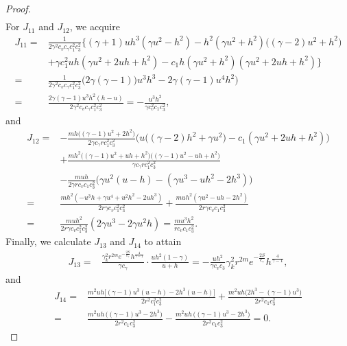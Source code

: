 \documentclass[11pt,reqno]{article}
\numberwithin{equation}{section}
\begin{document}
\begin{proof}
\begin{align*}
\end{align*}
For $J_{11}$ and $J_{12}$, we acquire
\begin{align*}
J_{11}
=& \frac{1}{2\gamma^{2} c_v c_\gamma c_1^{2} c_3^{2}} \bigg\{
   (\gamma+1)uh^{3}(\gamma u^{2}-h^{2}) - h^{2}(\gamma u^{2}+h^{2})\big((\gamma-2)u^{2}+h^{2}\big) \\
& + \gamma c_1^{2} uh (\gamma u^{2}+2uh+h^{2}) - c_1 h (\gamma u^{2}+h^{2})(\gamma u^{2}+2uh+h^{2}) \bigg\} \\
=& \frac{1}{2\gamma^{2} c_v c_\gamma c_1^{2} c_3^{2}} \Big(
   2\gamma(\gamma-1))u^3 h^3 -2\gamma(\gamma-1)u^4 h^2 \Big) \\
=& \frac{2\gamma(\gamma-1)u^3 h^2(h - u)}{2\gamma^{2} c_v c_\gamma c_1^{2} c_3^{2}} = -\frac{u^3 h^2}{\gamma c_v^2 c_1 c_3^2},
\end{align*}
and
\begin{align*}
J_{12}
=& -\frac{mh\big((\gamma-1)u^{2}+2h^{2}\big)}{2\gamma c_\gamma r c_1^{2} c_3^{2}} \Big( u\big((\gamma-2)h^{2}+\gamma u^{2}\big)
- c_1(\gamma u^{2}+2uh+h^{2}) \Big) \\
& + \frac{mh^{2}\big((\gamma-1)u^{2}+uh+h^{2}\big)\big((\gamma-1)u^{2}-uh+h^{2}\big)}{\gamma c_\gamma r c_1^{2} c_3^{2}} \\
& - \frac{muh}{2\gamma r c_v c_1 c_3^{2}} \Big( \gamma u^{2}(u-h) - (\gamma u^{3}-uh^{2}-2h^{3}) \Big)\\
=&\frac{mh^2\left( -u^3 h + \gamma u^4 + u^2 h^2 - 2 u h^3 \right)}{2r\gamma c_v  c_1^{2} c_3^{2}}
+\frac{muh^2\left( \gamma u^2 - uh -2 h^2 \right)}{2r \gamma c_v c_1 c_3^2}\\
=&\frac{mu h^2 }{2r\gamma c_v c_1^2 c_3^2} ( 2\gamma u^3 - 2\gamma u^2 h )
= \frac{mu^3 h^2 }{r c_v c_1 c_3^2}.
\end{align*}
Finally, we calculate $J_{13}$ and $J_{14}$ to attain
\begin{align*}
J_{13}=& \frac{\gamma_k^2 r^{2m} e^{-\frac{2S}{c_\gamma}} h^{\frac{4}{\gamma-1}}}{\gamma c_{\gamma}}
\cdot \frac{u h^2 (1-\gamma)}{u+h} = -\frac{u h^2}{\gamma c_v c_3}\gamma_k^2 r^{2m} e^{-\frac{2S}{c_\gamma}} h^{\frac{4}{\gamma-1}},
\end{align*}
and
\begin{align*}
J_{14}
=& \frac{m^{2}uh\big[ (\gamma-1)u^{3}(u-h) - 2h^{3}(u-h) \big]}{2r^{2}c_1^{2} c_3^{2}}
   + \frac{m^{2}uh\big(2h^{3}-(\gamma-1)u^{3}\big)}{2r^{2} c_1 c_3^{2}} \\
=& \frac{m^{2}uh\,\big((\gamma-1)u^{3}-2h^{3}\big)}{2r^{2}c_1 c_3^{2}}
   - \frac{m^{2}uh\,\big((\gamma-1)u^{3}-2h^{3}\big)}{2r^{2}c_1 c_3^{2}}= 0.
\end{align*}


\end{proof}
\end{document}
